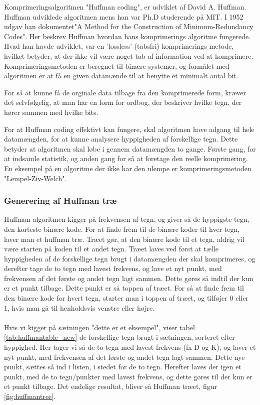 Komprimeringsalgoritmen "Huffman coding", er udviklet af David A. Huffman. Huffman udviklede algoritmen mens han var Ph.D studerende på MIT. I 1952 udgav han dokumentet"A Method for the Construction of Minimum-Redundancy Codes"\cite{A_Method_for}. Her beskrev Huffman hvordan hans komprimerings algoritme fungerede. Hvad han havde udviklet, var en 'lossless' (tabsfri) komprimerings metode, hvilket betyder, at der ikke vil være noget tab af information ved at komprimere. Komprimeringsmetoden er beregnet til binære systemer, og formålet med algoritmen er at få en given datamænde til at benytte et minimalt antal bit. 

For så at kunne få de orginale data tilbage fra den komprimerede form, kræver det selvfølgelig, at man har en form for ordbog, der beskriver hvilke tegn, der hører sammen med hvilke bits.

For at Huffman coding effektivt kan fungere, skal algoritmen have adgang til hele datamængden, for at kunne analysere hyppigheden af forskellige tegn. Dette betyder at algoritmen skal løbe i gennem datamængden to gange. Første gang, for at indsamle statistik, og anden gang for så at foretage den reelle komprimering. En eksempel på en algoritme der ikke har den ulempe er komprimeringsmetoden "Lempel-Ziv-Welch".


\subsubsection{Generering af Huffman træ}
Huffman algoritmen kigger på frekvensen af tegn, og giver så de hyppigste tegn, den korteste binære kode. For at finde frem til de binære koder til hver tegn, laver man et huffman træ. Træet gør, at den binære kode til et tegn, aldrig vil være starten på koden til et andet tegn. Træet laves ved først at tælle hyppigheden af de forskellige tegn brugt i datamængden der skal komprimeres, og derefter tage de to tegn med lavest frekvens, og lave et nyt punkt, med frekvensen af det første og andet tegn lagt sammen. Dette gøres så indtil der kun er et punkt tilbage. Dette punkt er så toppen af træet. For så at finde frem til den binære kode for hvert tegn, starter man i toppen af træet, og tilføjer 0 eller 1, hvis man gå til henholdsvis venstre eller højre.
\\
\\
Hvis vi kigger på sætningen "dette er et eksempel", viser tabel \ref{tab:huffmantable_new} de forskellige tegn brugt i sætningen, sorteret efter hyppighed. Her tager vi så de to tegn med lavest frekvens (fx D og K), og laver et nyt punkt, med frekvensen af det første og andet tegn lagt sammen. Dette nye punkt, sættes så ind i listen, i stedet for de to tegn. Herefter laves der igen et punkt, med de to tegn/punkter med lavest frekvens, og dette gøres til der kun er et punkt tilbage. Det endelige resultat, bliver så Huffman træet, figur \ref{fig:huffmantree}. 



